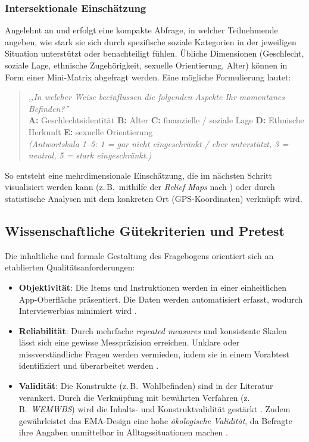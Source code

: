 \subsubsection{Intersektionale Einschätzung}
Angelehnt an \parencite{crenshaw_mapping_1991} und \parencite{rodo-de-zarate_developing_2014} erfolgt eine kompakte Abfrage, in welcher Teilnehmende angeben, wie stark sie sich durch spezifische soziale Kategorien in der jeweiligen Situation unterstützt oder benachteiligt fühlen. Übliche Dimensionen (Geschlecht, soziale Lage, ethnische Zugehörigkeit, sexuelle Orientierung, Alter) können in Form einer Mini-Matrix abgefragt werden. Eine mögliche Formulierung lautet:

\begin{quote}
  \emph{,,In welcher Weise beeinflussen die folgenden Aspekte Ihr momentanes Befinden?''} \\
  \textbf{A:} Geschlechtsidentität \quad
  \textbf{B:} Alter \quad
  \textbf{C:} finanzielle / soziale Lage \quad
  \textbf{D:} Ethnische Herkunft \quad
  \textbf{E:} sexuelle Orientierung \\
  \textit{(Antwortskala 1--5: 1 = gar nicht eingeschränkt / eher unterstützt, 3 = neutral, 5 = stark eingeschränkt.)}
\end{quote}

So entsteht eine mehrdimensionale Einschätzung, die im nächsten Schritt visualisiert werden kann (z.\,B.\ mithilfe der \emph{Relief Maps} nach \cite{rodo-de-zarate_developing_2014}) oder durch statistische Analysen mit dem konkreten Ort (GPS-Koordinaten) verknüpft wird.

\subsection{Wissenschaftliche Gütekriterien und Pretest}
\label{sec:gütekriterien}
Die inhaltliche und formale Gestaltung des Fragebogens orientiert sich an etablierten Qualitätsanforderungen:
\begin{itemize}
    \item \textbf{Objektivität}: Die Items und Instruktionen werden in einer einheitlichen App-Oberfläche präsentiert. Die Daten werden automatisiert erfasst, wodurch Interviewerbias minimiert wird \parencite{dillman_internet_2014}.
    \item \textbf{Reliabilität}: Durch mehrfache \emph{repeated measures} und konsistente Skalen lässt sich eine gewisse Messpräzision erreichen. Unklare oder missverständliche Fragen werden vermieden, indem sie in einem Vorabtest identifiziert und überarbeitet werden \parencite{krosnick_question_2009}.
    \item \textbf{Validität}: Die Konstrukte (z.\,B.\ Wohlbefinden) sind in der Literatur verankert. Durch die Verknüpfung mit bewährten Verfahren (z.\,B.\ \emph{WEMWBS}) wird die Inhalts- und Konstruktvalidität gestärkt \parencite{tennant_warwick-edinburgh_2007}. Zudem gewährleistet das EMA-Design eine hohe \emph{ökologische Validität}, da Befragte ihre Angaben unmittelbar in Alltagssituationen machen \parencite{stone_ecological_1994}.
\end{itemize}

